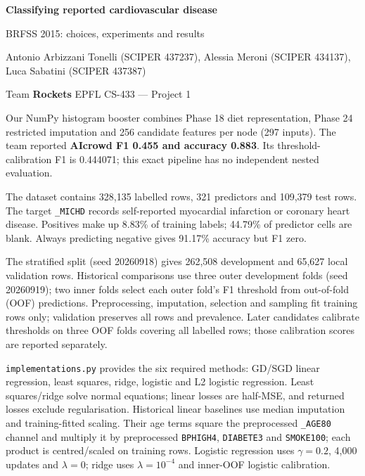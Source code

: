 \documentclass[10pt,a4paper]{article}
\newcommand{\heading}[1]{\vspace{5pt}{\large\bfseries #1}\par\vspace{2pt}}
\newcommand{\code}[1]{\texttt{\small #1}}
\begin{document}
\begin{center}
{\LARGE\bfseries Classifying reported cardiovascular disease\par}
\vspace{3pt}
{\large BRFSS 2015: choices, experiments and results}\par
\vspace{3pt}
{\small Antonio Arbizzani Tonelli (SCIPER 437237), Alessia Meroni (SCIPER 434137), Luca Sabatini (SCIPER 437387)\par}
\vspace{3pt}
Team \textbf{Rockets} \quad EPFL CS-433 --- Project 1
\end{center}
\vspace{-3pt}

Our NumPy histogram booster combines Phase 18 diet representation, Phase 24
restricted imputation and 256 candidate features per node (297 inputs).
The team reported \textbf{AIcrowd F1 0.455 and accuracy 0.883}.
Its threshold-calibration F1 is 0.444071; this exact pipeline has no independent
nested evaluation.

\heading{Data and evaluation}
The dataset contains 328,135 labelled rows, 321 predictors and 109,379 test
rows. The target \code{\_MICHD} records self-reported myocardial infarction
or coronary heart disease. Positives make up 8.83\% of training labels;
44.79\% of predictor cells are blank. Always predicting negative gives
91.17\% accuracy but F1 zero.

The stratified split (seed 20260918) gives 262,508 development and 65,627
local validation rows. Historical comparisons use three outer development
folds (seed 20260919); two inner folds select each outer fold's F1 threshold
from out-of-fold (OOF) predictions. Preprocessing, imputation, selection and
sampling fit training rows only; validation preserves all rows and prevalence.
Later candidates calibrate thresholds on three OOF folds covering all labelled
rows; those calibration scores are reported separately.

\heading{Methods and preprocessing}
\code{implementations.py} provides the six required methods: GD/SGD linear
regression, least squares, ridge, logistic and L2 logistic regression.
Least squares/ridge solve normal equations; linear losses are half-MSE,
and returned losses exclude regularisation.
Historical linear baselines use median imputation and training-fitted scaling.
Their age terms square the preprocessed \code{\_AGE80} channel and multiply it
by preprocessed \code{BPHIGH4}, \code{DIABETE3} and \code{SMOKE100}; each product
is centred/scaled on training rows. Logistic regression uses $\gamma=0.2$,
4,000 updates and $\lambda=0$; ridge uses $\lambda=10^{-4}$ and inner-OOF
logistic calibration.
\end{document}
